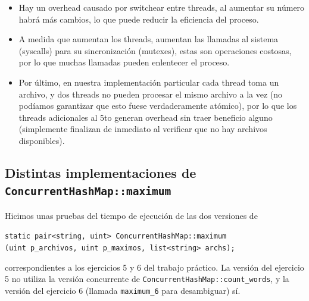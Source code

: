 \begin{itemize}

	\item Hay un overhead causado por switchear entre threads, al aumentar su número habrá más cambios, lo que puede reducir la eficiencia del proceso.

	\item A medida que aumentan los threads, aumentan las llamadas al sistema (syscalls) para su sincronización (mutexes), estas son operaciones costosas, por lo que muchas llamadas pueden enlentecer el proceso.

	\item Por último, en nuestra implementación particular cada thread toma un archivo, y dos threads no pueden procesar el mismo archivo a la vez (no podíamos garantizar que esto fuese verdaderamente atómico), por lo que los threads adicionales al 5to generan overhead sin traer beneficio alguno (simplemente finalizan de inmediato al verificar que no hay archivos disponibles).

\end{itemize}

\subsection{Distintas implementaciones de \texttt{ConcurrentHashMap::maximum}}

Hicimos unas pruebas del tiempo de ejecución de las dos versiones de

\begin{center}
	\texttt{static pair<string, uint> ConcurrentHashMap::maximum\\(uint p\_archivos, uint p\_maximos, list<string> archs);}
\end{center}

correspondientes a los ejercicios 5 y 6 del trabajo práctico. La versión del ejercicio 5 no utiliza la versión concurrente de \texttt{ConcurrentHashMap::count\_words}, y la versión del ejercicio 6 (llamada \texttt{maximum\_6} para desambiguar) sí.

